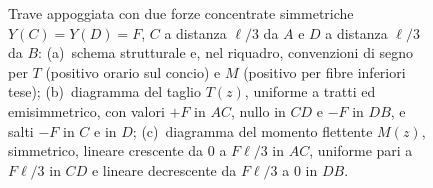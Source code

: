 \begin{figure}[htbp]
{
			}
			\caption{Trave appoggiata con due forze concentrate simmetriche
				$Y(C) = Y(D) = F$, $C$ a distanza $\ell/3$ da $A$ e $D$
				a distanza $\ell/3$ da $B$:
				(a)~schema strutturale e, nel riquadro, convenzioni di segno
				per $T$ (positivo orario sul concio) e $M$ (positivo per
				fibre inferiori tese);
				(b)~diagramma del taglio $T(z)$, uniforme a tratti
				ed emisimmetrico, con valori $+F$ in $AC$, nullo in $CD$
				e $-F$ in $DB$, e salti $-F$ in $C$ e in $D$;
				(c)~diagramma del momento flettente $M(z)$, simmetrico,
				lineare crescente da $0$ a $F\ell/3$ in $AC$, uniforme
				pari a $F\ell/3$ in $CD$ e lineare decrescente da $F\ell/3$
				a $0$ in $DB$.}
			\label{fig:stat_trasv_iso_00c}
		\end{figure}
